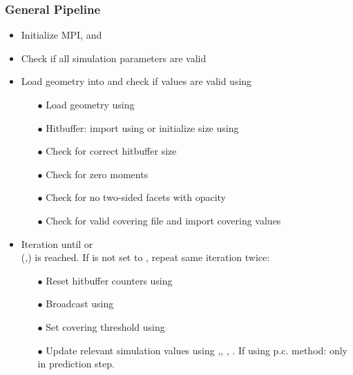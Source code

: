 \subsubsection{General Pipeline}
\begin{itemize}[noitemsep,topsep=0pt, partopsep=0pt]
\item Initialize MPI,  and 
\item Check if all simulation parameters are valid
\item Load geometry into  and check if values are valid using 
	\begin{itemize}[noitemsep,topsep=0pt, partopsep=0pt]
		\item[$\bullet$] Load geometry using 
		\item[$\bullet$] Hitbuffer: import using   or initialize size using  
		\item[$\bullet$] Check for correct hitbuffer size
		\item[$\bullet$] Check for zero moments
		\item[$\bullet$] Check for no two-sided facets with opacity
		\item[$\bullet$] Check for valid covering file and import covering values
	\end{itemize}
\item{Iteration until  or\\  (,) is reached. If  is not set to , repeat same iteration twice: \smallskip}
	\begin{itemize}[noitemsep,topsep=0pt, partopsep=0pt]
	\item[$\bullet$] Reset hitbuffer counters using 
	\item[$\bullet$] Broadcast  using 
	\item[$\bullet$] Set covering threshold  using 
	\item[$\bullet$] Update relevant simulation values using ,\linebreak[4] , , . If using p.c. method: only in prediction step.

\end{itemize}
\end{itemize}
